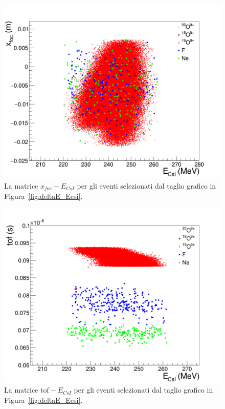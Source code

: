 \begin{figure} [!p]
	\centering
	\includegraphics[width=\textwidth, keepaspectratio]{Grafici_Tesi2/PID/xf_csi_taglio2.png}
	\caption{La matrice $x_{foc} - E_{CsI}$ per gli eventi selezionati dal taglio grafico in Figura~\ref{fig:deltaE_Ecsi}.} \label{fig:xf_Ecsi_O20}
\end{figure} 
\begin{figure} [!p]
	\centering
	\includegraphics[width=\textwidth, keepaspectratio]{Grafici_Tesi2/PID/tof_csi_taglio.png}
	\caption{La matrice $\mbox{tof} - E_{CsI}$ per gli eventi selezionati dal taglio grafico in Figura~\ref{fig:deltaE_Ecsi}.} \label{fig:tof_Ecsi_O20}
\end{figure} 


